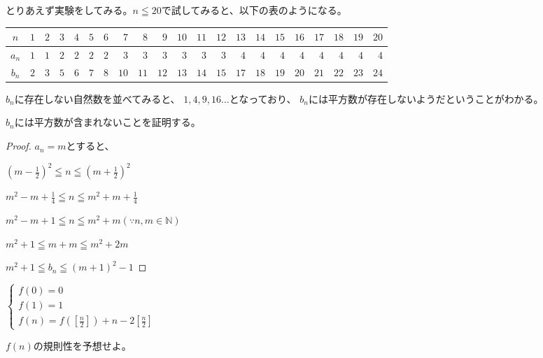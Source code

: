 \documentclass[uplatex,dvipdfmx]{jsbook}
\begin{document}
\begin{answer}
    とりあえず実験をしてみる。$n\leqq 20$で試してみると、以下の表のようになる。

    \begin{center}
        \begin{tabular}{|c||r|r|r|r|r|r|r|r|r|r|r|r|r|r|r|r|r|r|r|r|}
            \hline
            $n$ & $1$ & $2$ & $3$ & $4$ & $5$ & $6$ & $7$ & $8$ & $9$ & $10$ & $11$ & $12$ & $13$ & $14$ & $15$ & $16$ & $17$ & $18$ & $19$ & $20$\\\hline
            $a_n$ & $1$ & $1$ & $2$ & $2$ & $2$ & $2$ & $3$ & $3$ & $3$ & $3$ & $3$ & $3$ & $4$ & $4$ & $4$ & $4$ & $4$ & $4$ & $4$ & $4$\\\hline
            $b_n$ & $2$ & $3$ & $5$ & $6$ & $7$ & $8$ & $10$ & $11$ & $12$ & $13$ & $14$ & $15$ & $17$ & $18$ & $19$ & $20$ & $21$ & $22$ & $23$ & $24$\\\hline
        \end{tabular}
    \end{center}

    $b_n$に存在しない自然数を並べてみると、
    $1,4,9,16\dots$となっており、
    $b_n$には平方数が存在しないようだということがわかる。

    $b_n$には平方数が含まれないことを証明する。

    \begin{proof}
        $a_n=m$とすると、

        $\displaystyle \left(m-\frac{1}{2}\right) ^2\leqq n\leqq \left(m+\frac{1}{2}\right) ^2$

        $\displaystyle m^2-m+\frac{1}{4}\leqq n \leqq m^2+m+\frac{1}{4}$

        $\displaystyle m^2-m+1\leqq n \leqq m^2+m \left(\because n,m \in \mathbb{N}\right)$

        $m^2+1\leqq m+m \leqq m^2+2m$

        $m^2+1\leqq b_n \leqq \left(m+1\right)^2-1$

    \end{proof}

\end{answer}

\begin{problem}[練習問題2]
    \begin{math}
        \begin{cases}
            f\left(0\right)=0\\
            f\left(1\right)=1\\
            \displaystyle f\left(n\right)=f\left(\left[\frac{n}{2}\right]\right)+n-2\left[\frac{n}{2}\right]
        \end{cases}
    \end{math}

    $f\left(n\right)$の規則性を予想せよ。
\end{problem}
\end{document}
